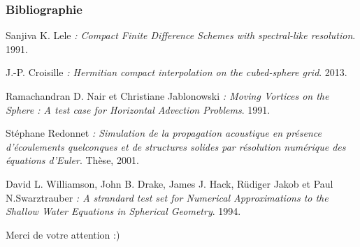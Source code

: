 \documentclass[11pt]{beamer}
\begin{document}
\begin{frame}
\frametitle{Bibliographie}

\begin{thebibliography}{9}
        

\scriptsize{

         Sanjiva K. Lele
         \emph{: Compact Finite Difference Schemes with spectral-like resolution}.
         1991.

         J.-P. Croisille
         \emph{: Hermitian compact interpolation on the cubed-sphere grid}.
         2013.

         Ramachandran D. Nair et Christiane Jablonowski
         \emph{: Moving Vortices on the Sphere : A test case for Horizontal Advection Problems}.
         1991.

         Stéphane Redonnet
         \emph{: Simulation de la propagation acoustique en présence d'écoulements quelconques et de structures solides par résolution numérique des équations d'Euler}.
         Thèse, 2001.
         
         David L. Williamson, John B. Drake, James J. Hack, Rüdiger Jakob et Paul N.Swarztrauber
         \emph{: A strandard test set for Numerical Approximations to the Shallow Water Equations in Spherical Geometry}.
         1994.
    
    }     
         
         
         
\end{thebibliography}
\end{frame}

\begin{frame}
\begin{center}
Merci de votre attention :)
\end{center}
\end{frame}
\end{document}
